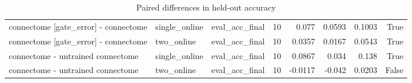 \begin{table}[t]
\begin{tabular}{lllrrrrr}
connectome [gate\_error] - connectome & single\_online & eval\_acc\_final & 10 & 0.077 & 0.0593 & 0.1003 & True \\
connectome [gate\_error] - connectome & two\_online & eval\_acc\_final & 10 & 0.0357 & 0.0167 & 0.0543 & True \\
connectome - untrained connectome & single\_online & eval\_acc\_final & 10 & 0.0867 & 0.034 & 0.138 & True \\
connectome - untrained connectome & two\_online & eval\_acc\_final & 10 & -0.0117 & -0.042 & 0.0203 & False \\
\bottomrule
\end{tabular}
\caption{Paired differences in held-out accuracy}
\label{tab:addition_paired}
\end{table}